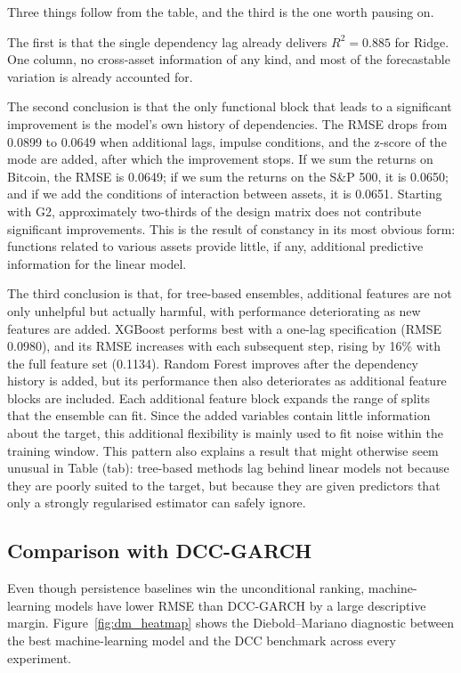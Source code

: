 Three things follow from the table, and the third is the one worth pausing on.

The first is that the single dependency lag already delivers $R^2 = 0.885$ for Ridge. One column, no cross-asset information of any kind, and most of the forecastable variation is already accounted for.

The second conclusion is that the only functional block that leads to a significant improvement is the model's own history of dependencies. The RMSE drops from 0.0899 to 0.0649 when additional lags, impulse conditions, and the z-score of the mode are added, after which the improvement stops. If we sum the returns on Bitcoin, the RMSE is 0.0649; if we sum the returns on the S\&P 500, it is 0.0650; and if we add the conditions of interaction between assets, it is 0.0651. Starting with G2, approximately two-thirds of the design matrix does not contribute significant improvements. This is the result of constancy in its most obvious form: functions related to various assets provide little, if any, additional predictive information for the linear model.

The third conclusion is that, for tree-based ensembles, additional features are not only unhelpful but actually harmful, with performance deteriorating as new features are added. XGBoost performs best with a one-lag specification (RMSE 0.0980), and its RMSE increases with each subsequent step, rising by 16\% with the full feature set (0.1134). Random Forest improves after the dependency history is added, but its performance then also deteriorates as additional feature blocks are included. Each additional feature block expands the range of splits that the ensemble can fit. Since the added variables contain little information about the target, this additional flexibility is mainly used to fit noise within the training window. This pattern also explains a result that might otherwise seem unusual in Table (tab): tree-based methods lag behind linear models not because they are poorly suited to the target, but because they are given predictors that only a strongly regularised estimator can safely ignore.

\subsection{Comparison with DCC-GARCH}

Even though persistence baselines win the unconditional ranking, machine-learning models have lower RMSE than DCC-GARCH by a large descriptive margin. Figure~\ref{fig:dm_heatmap} shows the Diebold--Mariano diagnostic between the best machine-learning model and the DCC benchmark across every experiment.

